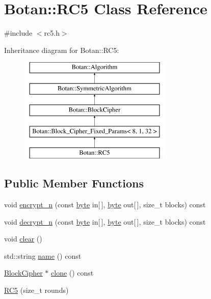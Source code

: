 \hypertarget{classBotan_1_1RC5}{\section{Botan\-:\-:R\-C5 Class Reference}
\label{classBotan_1_1RC5}
}


{\ttfamily \#include $<$rc5.\-h$>$}

Inheritance diagram for Botan\-:\-:R\-C5\-:\begin{figure}[H]
\begin{center}
\leavevmode
\includegraphics[height=5.000000cm]{classBotan_1_1RC5}
\end{center}
\end{figure}
\subsection*{Public Member Functions}
\begin{DoxyCompactItemize}
\item 
void \hyperlink{classBotan_1_1RC5_ad65522d57a6f313cd9bd5036aadb01d8}{encrypt\-\_\-n} (const \hyperlink{namespaceBotan_a7d793989d801281df48c6b19616b8b84}{byte} in\mbox{[}$\,$\mbox{]}, \hyperlink{namespaceBotan_a7d793989d801281df48c6b19616b8b84}{byte} out\mbox{[}$\,$\mbox{]}, size\-\_\-t blocks) const 
\item 
void \hyperlink{classBotan_1_1RC5_a708a1fc281b6e305d38694cef6e93c53}{decrypt\-\_\-n} (const \hyperlink{namespaceBotan_a7d793989d801281df48c6b19616b8b84}{byte} in\mbox{[}$\,$\mbox{]}, \hyperlink{namespaceBotan_a7d793989d801281df48c6b19616b8b84}{byte} out\mbox{[}$\,$\mbox{]}, size\-\_\-t blocks) const 
\item 
void \hyperlink{classBotan_1_1RC5_a201a5f69ffebca47d4af2f6319be95f3}{clear} ()
\item 
std\-::string \hyperlink{classBotan_1_1RC5_af875a4d3035f7d1365b0c16d5b11cdee}{name} () const 
\item 
\hyperlink{classBotan_1_1BlockCipher}{Block\-Cipher} $\ast$ \hyperlink{classBotan_1_1RC5_a4c27ce1b2f8368054558ca90cd4331fb}{clone} () const 
\item 
\hyperlink{classBotan_1_1RC5_a91ef2c2a798fd2deccf021a37be49e59}{R\-C5} (size\-\_\-t rounds)
\end{DoxyCompactItemize}
